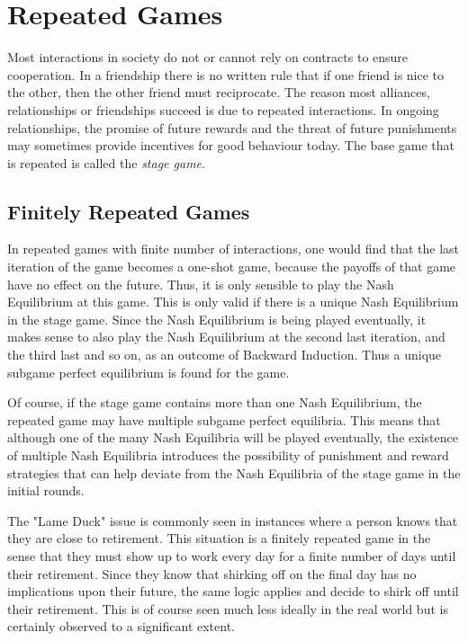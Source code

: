 \documentclass[11pt]{article}
\theoremstyle{definition}
\begin{document}
\section{Repeated Games}

Most interactions in society do not or cannot rely on contracts to ensure cooperation. In a friendship there is no written rule that if one friend is nice to the other, then the other friend must reciprocate. The reason most alliances, relationships or friendships succeed is due to repeated interactions. In ongoing relationships, the promise of future rewards and the threat of future punishments may sometimes provide incentives for good behaviour today. The base game that is repeated is called the \textit{stage game}.

\subsection{Finitely Repeated Games}

In repeated games with finite number of interactions, one would find that the last iteration of the game becomes a one-shot game, because the payoffs of that game have no effect on the future. Thus, it is only sensible to play the Nash Equilibrium at this game. This is only valid if there is a unique Nash Equilibrium in the stage game. Since the Nash Equilibrium is being played eventually, it makes sense to also play the Nash Equilibrium at the second last iteration, and the third last and so on, as an outcome of Backward Induction. Thus a unique subgame perfect equilibrium is found for the game. 

Of course, if the stage game contains more than one Nash Equilibrium, the repeated game may have multiple subgame perfect equilibria. This means that although one of the many Nash Equilibria will be played eventually, the existence of multiple Nash Equilibria introduces the possibility of punishment and reward strategies that can help deviate from the Nash Equilibria of the stage game in the initial rounds.

The "Lame Duck" issue is commonly seen in instances where a person knows that they are close to retirement. This situation is a finitely repeated game in the sense that they must show up to work every day for a finite number of days until their retirement. Since they know that shirking off on the final day has no implications upon their future, the same logic applies and decide to shirk off until their retirement. This is of course seen much less ideally in the real world but is certainly observed to a significant extent.
\end{document}
